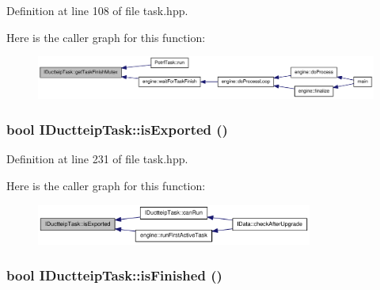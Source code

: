 Definition at line 108 of file task.hpp.

Here is the caller graph for this function:\nopagebreak
\begin{figure}[H]
\begin{center}
\leavevmode
\includegraphics[width=375pt]{class_i_ductteip_task_a1f3ee21dbaeab6688bcc6bda4a9355ca_icgraph}
\end{center}
\end{figure}
\hypertarget{class_i_ductteip_task_af4805b045773376b86d6183048477eee}{
\subsubsection[{isExported}]{\setlength{\rightskip}{0pt plus 5cm}bool IDuctteipTask::isExported ()}}
\label{class_i_ductteip_task_af4805b045773376b86d6183048477eee}


Definition at line 231 of file task.hpp.

Here is the caller graph for this function:\nopagebreak
\begin{figure}[H]
\begin{center}
\leavevmode
\includegraphics[width=257pt]{class_i_ductteip_task_af4805b045773376b86d6183048477eee_icgraph}
\end{center}
\end{figure}
\hypertarget{class_i_ductteip_task_ab92791950ee2fe51cf1005421cb87695}{
\subsubsection[{isFinished}]{\setlength{\rightskip}{0pt plus 5cm}bool IDuctteipTask::isFinished ()}}
\label{class_i_ductteip_task_ab92791950ee2fe51cf1005421cb87695}



